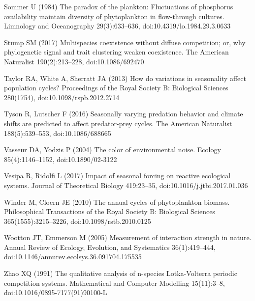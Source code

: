 \documentclass[a4paper,12pt]{article}
\begin{document}
\begin{thebibliography}{68}
Sommer U (1984) The paradox of the plankton: {Fluctuations} of phosphorus
  availability maintain diversity of phytoplankton in flow-through cultures.
  Limnology and Oceanography 29(3):633--636, doi:{10.4319/lo.1984.29.3.0633}

Stump SM (2017) Multispecies coexistence without diffuse competition; or, why
  phylogenetic signal and trait clustering weaken coexistence. The American
  Naturalist 190(2):213--228, doi:{10.1086/692470}

Taylor RA, White A, Sherratt JA (2013) How do variations in seasonality affect
  population cycles? Proceedings of the Royal Society B: Biological Sciences
  280(1754), doi:{10.1098/rspb.2012.2714}

Tyson R, Lutscher F (2016) Seasonally varying predation behavior and climate
  shifts are predicted to affect predator-prey cycles. The American Naturalist
  188(5):539--553, doi:{10.1086/688665}

Vasseur DA, Yodzis P (2004) {T}he color of environmental noise. Ecology
  85(4):1146--1152, doi:{10.1890/02-3122}

Vesipa R, Ridolfi L (2017) Impact of seasonal forcing on reactive ecological
  systems. Journal of Theoretical Biology 419:23--35,
  doi:{10.1016/j.jtbi.2017.01.036}

Winder M, Cloern JE (2010) The annual cycles of phytoplankton biomass.
  Philosophical Transactions of the Royal Society B: Biological Sciences
  365(1555):3215--3226, doi:{10.1098/rstb.2010.0125}

Wootton JT, Emmerson M (2005) Measurement of interaction strength in nature.
  Annual Review of Ecology, Evolution, and Systematics 36(1):419--444,
  doi:{10.1146/annurev.ecolsys.36.091704.175535}

Zhao XQ (1991) The qualitative analysis of n-species {L}otka-{V}olterra
  periodic competition systems. Mathematical and Computer Modelling
  15(11):3--8, doi:{10.1016/0895-7177(91)90100-L}

\end{thebibliography}
\end{document}
